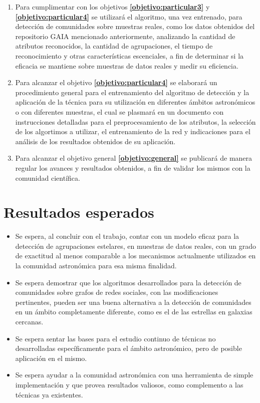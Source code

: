 \documentclass[
	11pt,oneside,a4paper,
	headsepline,footsepline,
	fleqn,
]{memoir}
\renewcommand\fbox{\fcolorbox{gray!50}{white}}
\begin{document}
\begin{enumerate}[label*=\fbox{A\arabic*}]
	\item Para cumplimentar con los objetivos \textbf{\ref{objetivo:particular3}} y \textbf{\ref{objetivo:particular4}} se utilizará el algoritmo, una vez entrenado, para detección de comunidades sobre muestras reales, como los datos obtenidos del repositorio GAIA mencionado anteriormente, analizando la cantidad de atributos reconocidos, la cantidad de agrupaciones, el tiempo de reconocimiento y otras características escenciales, a fin de determinar si la eficacia se mantiene sobre muestras de datos reales y medir su eficiencia.
	
	\item Para alcanzar el objetivo \textbf{\ref{objetivo:particular4}} se elaborará un procedimiento general para el entrenamiento del algoritmo de detección y la aplicación de la técnica para su utilización en diferentes ámbitos astronómicos o con diferentes muestras, el cual se plasmará en un documento con instrucciones detalladas para el preprocesamiento de los atributos, la selección de los algortimos a utilizar, el entrenamiento de la red y indicaciones para el análisis de los resultados obtenidos de su aplicación.
	
	\item Para alcanzar el objetivo general \textbf{\ref{objetivo:general}} se publicará de manera regular los avances y resultados obtenidos, a fin de validar los mismos con la comunidad científica.
\end{enumerate}


\section{Resultados esperados}

\begin{itemize}
	\item Se espera, al concluir con el trabajo, contar con un modelo eficaz para la detección de agrupaciones estelares, en muestras de datos reales, con un grado de exactitud al menos comparable a los mecanismos actualmente utilizados en la comunidad astronómica para esa misma finalidad.
	\item Se espera demostrar que los algoritmos desarrollados para la detección de comunidades sobre grafos de redes sociales, con las modificaciones pertinentes, pueden ser una buena alternativa a la detección de comunidades en un ámbito completamente diferente, como es el de las estrellas en galaxias cercanas.
	\item Se espera sentar las bases para el estudio continuo de técnicas no desarrolladas específicamente para el ámbito astronómico, pero de posible aplicación en el mismo.
	\item Se espera ayudar a la comunidad astronómica con una herramienta de simple implementación y que provea resultados valiosos, como complemento a las técnicas ya existentes.
\end{itemize}
\end{document}
